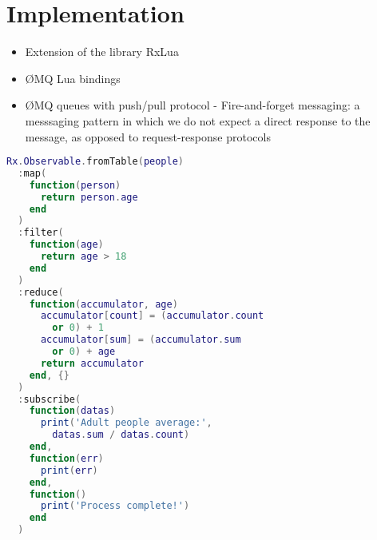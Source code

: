 \section{Implementation}
\label{sec:implementation}

\begin{itemize}
  \item Extension of the library RxLua
  \item ØMQ Lua bindings
  \item ØMQ queues with push/pull protocol - Fire-and-forget messaging: a messsaging pattern in which we do not expect a direct response to the message, as opposed to request-response protocols
\end{itemize}





\begin{lstlisting}[language=LUA,firstnumber=4,mathescape=true,caption={todo},label=lst:todo]
Rx.Observable.fromTable(people)
  :map(
    function(person)
      return person.age
    end
  )
  :filter(
    function(age)
      return age > 18
    end
  )
  :reduce(
    function(accumulator, age)
      accumulator[count] = (accumulator.count
        or 0) + 1
      accumulator[sum] = (accumulator.sum
        or 0) + age
      return accumulator
    end, {}
  )
  :subscribe(
    function(datas)
      print('Adult people average:',
        datas.sum / datas.count)
    end,
    function(err)
      print(err)
    end,
    function()
      print('Process complete!')
    end
  )
\end{lstlisting}